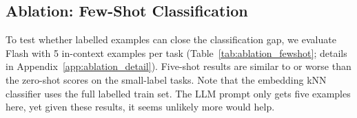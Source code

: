 \subsection{Ablation: Few-Shot Classification}
\label{sec:fewshot}

To test whether labelled examples can close the classification gap, we evaluate Flash with 5 in-context examples per task (Table~\ref{tab:ablation_fewshot}; details in Appendix~\ref{app:ablation_detail}).
Five-shot results are similar to or worse than the zero-shot scores on the small-label tasks. Note that the embedding kNN classifier uses the full labelled train set. The LLM prompt only gets five examples here, yet given these results, it seems unlikely more would help.
